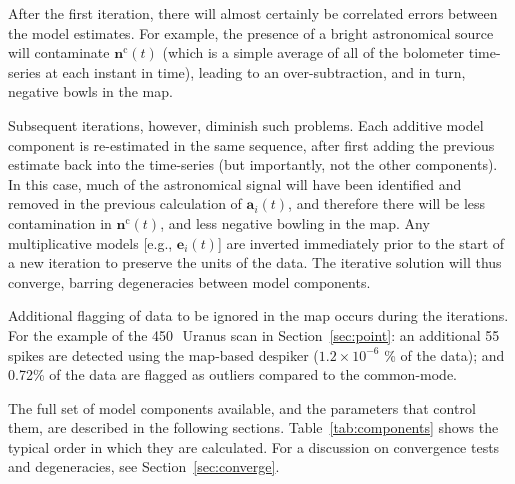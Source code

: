 \documentclass[useAMS,usenatbib,nofootinbib]{mn2e}
\begin{document}
After the first iteration, there will almost certainly be correlated
errors between the model estimates. For example, the presence of a
bright astronomical source will contaminate $\mathbf{n}^\mathrm{c}(t)$
(which is a simple average of all of the bolometer time-series at each
instant in time), leading to an over-subtraction, and in turn,
negative bowls in the map.

Subsequent iterations, however, diminish such problems. Each additive
model component is re-estimated in the same sequence, after first
adding the previous estimate back into the time-series (but
importantly, not the other components). In this case, much of the
astronomical signal will have been identified and removed in the
previous calculation of $\mathbf{a}_i(t)$, and therefore there will be
less contamination in $\mathbf{n}^\mathrm{c}(t)$, and less negative
bowling in the map. Any multiplicative models [e.g.,
$\mathbf{e}_i(t)$] are inverted immediately prior to the start of a
new iteration to preserve the units of the data. The iterative
solution will thus converge, barring degeneracies between model
components.

Additional flagging of data to be ignored in the map occurs during the
iterations. For the example of the 450\,\micron\ Uranus scan in
Section~\ref{sec:point}: an additional 55 spikes are detected using
the map-based despiker ($1.2\times10^{-6}$ \% of the data); and 0.72\%
of the data are flagged as outliers compared to the common-mode.

The full set of model components available, and the parameters that
control them, are described in the following
sections. Table~\ref{tab:components} shows the typical order in which
they are calculated. For a discussion on convergence tests and
degeneracies, see Section~\ref{sec:converge}.
\end{document}
